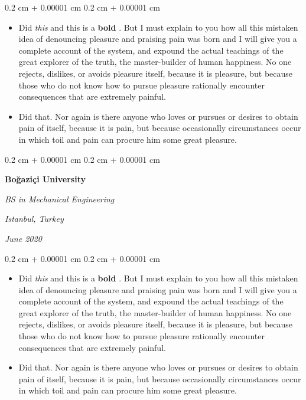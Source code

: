 \documentclass[10pt, letterpaper]{article}
\newenvironment{highlights}{
    \begin{itemize}[
        topsep=0.10 cm,
        parsep=0.10 cm,
        partopsep=0pt,
        itemsep=0pt,
        leftmargin=0.4 cm + 10pt
    ]
}{
    \end{itemize}
} %
\newenvironment{onecolentry}{
    \begin{adjustwidth}{
        0.2 cm + 0.00001 cm
    }{
        0.2 cm + 0.00001 cm
    }
}{
    \end{adjustwidth}
} %
\newenvironment{twocolentry}[2][]{
    \onecolentry
    \def\secondColumn{#2}
    \setcolumnwidth{\fill, 4.5 cm}
    \begin{paracol}{2}
}{
    \switchcolumn \raggedleft \secondColumn
    \end{paracol}
    \endonecolentry
} %
\let\hrefWithoutArrow\href
\renewcommand{\href}[2]{\hrefWithoutArrow{#1}{\ifthenelse{\equal{#2}{}}{ }{#2 }\raisebox{.15ex}{\footnotesize \faExternalLink*}}}
\begin{document}
        \vspace{0.10 cm}
        \begin{onecolentry}
            \begin{highlights}
                \item Did \textit{this} and this is a \textbf{bold} \href{https://example.com}{link}. But I must explain to you how all this mistaken idea of denouncing pleasure and praising pain was born and I will give you a complete account of the system, and expound the actual teachings of the great explorer of the truth, the master-builder of human happiness. No one rejects, dislikes, or avoids pleasure itself, because it is pleasure, but because those who do not know how to pursue pleasure rationally encounter consequences that are extremely painful.
                \item Did that. Nor again is there anyone who loves or pursues or desires to obtain pain of itself, because it is pain, but because occasionally circumstances occur in which toil and pain can procure him some great pleasure.
            \end{highlights}
        \end{onecolentry}


        \vspace{0.2 cm}

        \begin{twocolentry}{
        \textit{Istanbul, Turkey}    
            
        \textit{June 2020}}
            \textbf{Boğaziçi University}

            \textit{BS in Mechanical Engineering}
        \end{twocolentry}

        \vspace{0.10 cm}
        \begin{onecolentry}
            \begin{highlights}
                \item Did \textit{this} and this is a \textbf{bold} \href{https://example.com}{link}. But I must explain to you how all this mistaken idea of denouncing pleasure and praising pain was born and I will give you a complete account of the system, and expound the actual teachings of the great explorer of the truth, the master-builder of human happiness. No one rejects, dislikes, or avoids pleasure itself, because it is pleasure, but because those who do not know how to pursue pleasure rationally encounter consequences that are extremely painful.
                \item Did that. Nor again is there anyone who loves or pursues or desires to obtain pain of itself, because it is pain, but because occasionally circumstances occur in which toil and pain can procure him some great pleasure.
            \end{highlights}
        \end{onecolentry}
\end{document}

